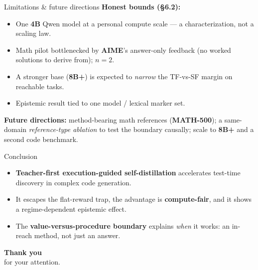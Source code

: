 \documentclass[10pt,aspectratio=169]{beamer}
\begin{document}
\begin{frame}{Limitations \& future directions}
\textbf{Honest bounds (\S6.2):}
\begin{itemize}
  \item One \textbf{4B} Qwen model at a personal compute scale --- a characterization, not a scaling law.
  \item Math pilot bottlenecked by \textbf{AIME}'s answer-only feedback (no worked solutions to derive from); $n{=}2$.
  \item A stronger base (\textbf{8B+}) is expected to \emph{narrow} the TF-vs-SF margin on reachable tasks.
  \item Epistemic result tied to one model / lexical marker set.
\end{itemize}
\vfill
\textbf{Future directions:} method-bearing math references (\textbf{MATH-500}); a same-domain \emph{reference-type ablation} to test the boundary causally; scale to \textbf{8B+} and a second code benchmark.
\end{frame}

\begin{frame}{Conclusion}
\begin{itemize}
  \item \textbf{Teacher-first execution-guided self-distillation} accelerates test-time discovery in complex code generation.
  \item It escapes the flat-reward trap, the advantage is \textbf{compute-fair}, and it shows a regime-dependent epistemic effect.
  \item The \textbf{value-versus-procedure boundary} explains \emph{when} it works: an in-reach method, not just an answer.
\end{itemize}
\end{frame}

\begin{frame}
\centering
\vspace{2.5cm}
{\Huge\bfseries Thank you}\\[0.6em]
{\Large for your attention.}
\vfill
\end{frame}
\end{document}
